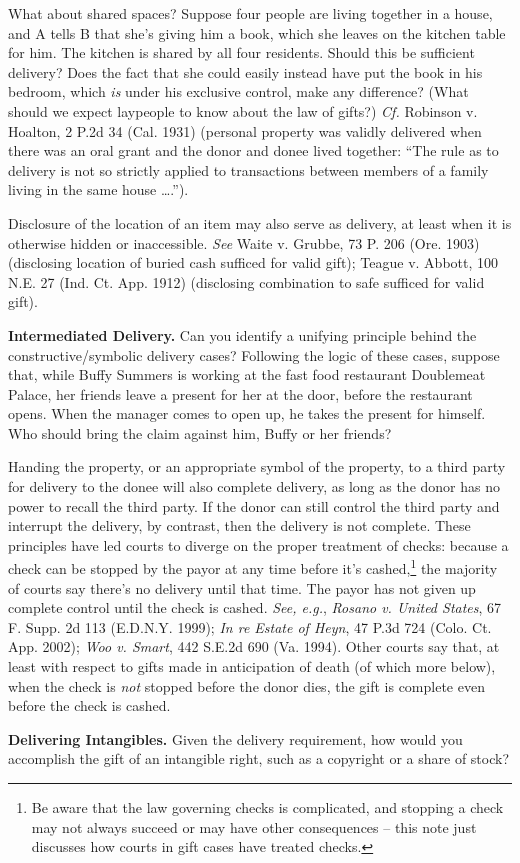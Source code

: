What about shared spaces?  Suppose four people are living together in a house,
and A tells B that she's giving him a book, which she leaves on the kitchen
table for him.  The kitchen is shared by all four residents.  Should this be
sufficient delivery?  Does the fact that she could easily instead have put the
book in his bedroom, which \textit{is} under his exclusive control, make any
difference?  (What should we expect laypeople to know about the law of gifts?) 
\textit{Cf.} Robinson v. Hoalton, 2 P.2d 34 (Cal. 1931) (personal property was
validly delivered when there was an oral grant and the donor and donee lived
together: ``The rule as to delivery is not so strictly applied to transactions
between members of a family living in the same house \dots{}.'').



Disclosure of the location of an item may also serve as delivery, at least when
it is otherwise hidden or inaccessible.  \textit{See} Waite v. Grubbe, 73 P.
206 (Ore. 1903) (disclosing location of buried cash sufficed for valid gift);
Teague v. Abbott, 100 N.E. 27 (Ind. Ct. App. 1912) (disclosing combination to
safe sufficed for valid gift).  



\item \textbf{Intermediated Delivery.} Can you identify a unifying principle
behind the constructive/symbolic delivery cases?  Following the logic of these
cases, suppose that, while Buffy Summers is working at the fast food restaurant
Doublemeat Palace, her friends leave a present for her at the door, before the
restaurant opens. When the manager comes to open up, he takes the present for
himself.  Who should bring the claim against him, Buffy or her friends?


Handing the property, or an appropriate symbol of the property, to a third party
for delivery to the donee will also complete delivery, as long as the donor has
no power to recall the third party.  If the donor can still control the third
party and interrupt the delivery, by contrast, then the delivery is not
complete.  These principles have led courts to diverge on the proper treatment
of checks: because a check can be stopped by the payor at any time before it's
cashed,\footnote{Be aware that the law governing checks is complicated, and
stopping a check may not always succeed or may have other consequences -- this
note just discusses how courts in gift cases have treated checks.} the majority
of courts say there's no delivery until that time.  The payor has not given up
complete control until the check is cashed.  \textit{See, e.g.}, \textit{Rosano
v. United States}, 67 F. Supp. 2d 113 (E.D.N.Y. 1999); \textit{ In re Estate of
Heyn}, 47 P.3d 724 (Colo. Ct. App. 2002); \textit{Woo v. Smart}, 442 S.E.2d 690
(Va. 1994).  Other courts say that, at least with respect to gifts made in
anticipation of death (of which more below), when the check is \textit{not}
stopped before the donor dies, the gift is complete even before the check is
cashed.  



\item \textbf{Delivering Intangibles.} Given the delivery requirement, how would
you accomplish the gift of an intangible right, such as a copyright or a share
of stock?

